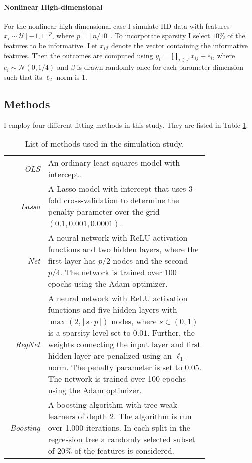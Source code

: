 \paragraph{Nonlinear High-dimensional}

For the nonlinear high-dimensional case I simulate IID data with features $x_i \sim
\mathcal{U}[-1, 1]^p$, where $p = \lfloor n / 10 \rfloor$. To incorporate sparsity I
select $10\%$ of the features to be informative. Let $x_{i\mathcal{I}}$ denote the
vector containing the informative features. Then the outcomes are computed using
$y_i = \prod_{j\in\mathcal{I}} x_{ij} + e_i$, where $e_i \sim \mathcal{N}(0, 1/4)$ and
$\beta$ is drawn randomly once for each parameter dimension such that its $\ell_2$-norm
is 1.


\subsection{Methods}

I employ four different fitting methods in this study. They are listed in Table
\ref{tab:methods}.

\begin{table}
\begin{tabular}{r | p{0.8\linewidth}}
    \textit{OLS} & An ordinary least squares model with intercept. \\
    \textit{Lasso} & A Lasso model with intercept that uses $3$-fold cross-validation to
        determine the penalty parameter over the grid $(0.1, 0.001, 0.0001)$.  \\
    \textit{Net} & A neural network with ReLU activation functions and two hidden
        layers, where the first layer has $p/2$ nodes and the second $p/4$. The network
        is trained over 100 epochs using the Adam optimizer.  \\
    \textit{RegNet} & A neural network with ReLU activation functions and five hidden
        layers with $\max(2, \lfloor s \cdot p \rfloor)$ nodes, where $s \in (0, 1)$ is
        a sparsity level set to $0.01$. Further, the weights connecting the input layer
        and first hidden layer are penalized using an $\ell_1$-norm. The penalty
        parameter is set to $0.05$. The network is trained over 100 epochs using the
        Adam optimizer. \\
    \textit{Boosting} & A boosting algorithm with tree weak-learners of depth 2. The
        algorithm is run over 1.000 iterations. In each split in the regression tree
        a randomly selected subset of $20\%$ of the features is considered.
\end{tabular}
\caption{List of methods used in the simulation study.}
\label{tab:methods}
\end{table}

